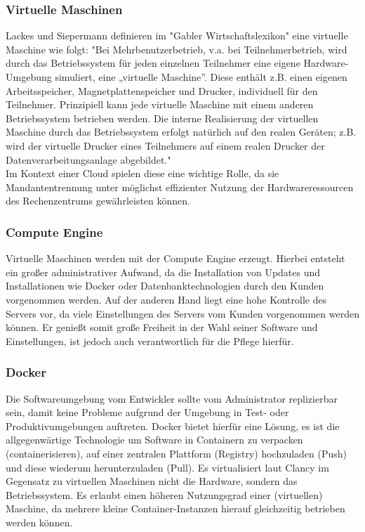 \documentclass[pdftex,a4paper,abstracton,11pt,parskip=half,bibtotocnumbered]{scrartcl}
\begin{document}
		\subsubsection{Virtuelle Maschinen}
			Lackes und Siepermann definieren im "Gabler Wirtschaftslexikon" eine virtuelle Maschine wie folgt: "Bei Mehrbenutzerbetrieb, v.a. bei Teilnehmerbetrieb, wird durch
			das Betriebssystem für jeden einzelnen Teilnehmer eine eigene Hardware-Umgebung simuliert, eine „virtuelle Maschine”. Diese enthält z.B. einen eigenen Arbeitsspeicher, 
			Magnetplattenspeicher und Drucker, individuell für den Teilnehmer. Prinzipiell kann jede virtuelle Maschine mit einem anderen Betriebssystem betrieben
			werden. Die interne Realisierung der virtuellen Maschine durch das Betriebssystem erfolgt natürlich auf den realen Geräten; z.B. wird der virtuelle Drucker
			eines Teilnehmers auf einem realen Drucker der Datenverarbeitungsanlage abgebildet." \cite{gabler-vm} \\
			Im Kontext einer Cloud spielen diese eine wichtige Rolle, da sie Mandantentrennung unter möglichst effizienter Nutzung der Hardwareressourcen
			des Rechenzentrums gewährleisten können.
		
		\subsubsection{Compute Engine}
			Virtuelle Maschinen werden mit der Compute Engine erzeugt. Hierbei entsteht ein großer administrativer Aufwand, da die Installation von Updates und 
			Installationen wie Docker oder Datenbanktechnologien durch den Kunden vorgenommen werden. 
			Auf der anderen Hand liegt eine hohe Kontrolle des Servers vor, da viele Einstellungen des Servers vom Kunden vorgenommen werden können. Er genießt somit
			große Freiheit in der Wahl seiner Software und Einstellungen, ist jedoch auch verantwortlich für die Pflege hierfür.
	

		\subsubsection{Docker}
			Die Softwareumgebung vom Entwickler sollte vom Administrator replizierbar sein, damit keine Probleme aufgrund der Umgebung in Test- oder Produktivumgebungen 
			auftreten. Docker bietet hierfür eine Lösung, es ist die allgegenwärtige Technologie \cite{vgl Venema S.40} um Software in Containern zu verpacken (containerisieren), 
			auf einer zentralen Plattform (Registry) hochzuladen (Push) und diese wiederum herunterzuladen (Pull). Es virtualisiert laut Clancy im Gegensatz zu virtuellen Maschinen
			nicht die Hardware, sondern das Betriebssystem. \cite{vgl. docker-virtualization} Es erlaubt einen höheren Nutzungsgrad einer (virtuellen) Maschine, da mehrere 
			kleine Container-Instanzen hierauf gleichzeitig betrieben werden können.
\end{document}
